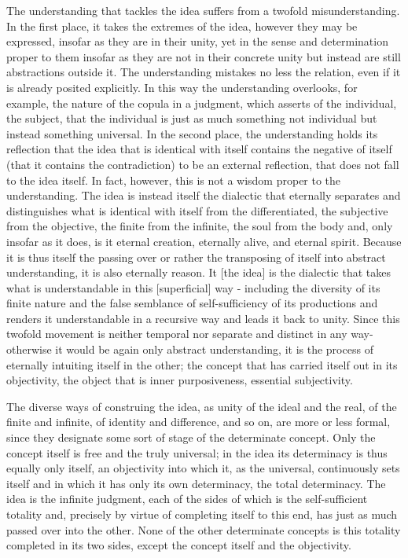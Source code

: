 The understanding that tackles the idea
suffers from a twofold misunderstanding.
In the first place, it takes the extremes of the idea,
however they may be expressed, insofar as they are in their unity,
yet in the sense and determination proper to them insofar as they are not
in their concrete unity but instead are still abstractions outside it.
The understanding mistakes no less the relation,
even if it is already posited explicitly.
In this way the understanding overlooks, for example,
the nature of the copula in a judgment,
which asserts of the individual, the subject,
that the individual is just as much something
not individual but instead something universal.
In the second place, the understanding holds its reflection that
the idea that is identical with itself contains the negative of itself
(that it contains the contradiction) to be an external reflection,
that does not fall to the idea itself.
In fact, however, this is not a wisdom proper to the understanding.
The idea is instead itself the dialectic that
eternally separates and distinguishes what is
identical with itself from the differentiated,
the subjective from the objective,
the finite from the infinite,
the soul from the body and,
only insofar as it does,
is it eternal creation,
eternally alive,
and eternal spirit.
Because it is thus itself the passing over or rather
the transposing of itself into abstract understanding,
it is also eternally reason.
It [the idea] is the dialectic that takes what is understandable
in this [superficial] way - including the diversity of its finite nature
and the false semblance of self-sufficiency of its productions
and renders it understandable in a recursive way
and leads it back to unity.
Since this twofold movement is neither temporal nor separate and distinct in any way-
otherwise it would be again only abstract understanding,
it is the process of eternally intuiting itself in the other;
the concept that has carried itself out in its objectivity,
the object that is inner purposiveness, essential subjectivity.

The diverse ways of construing the idea,
as unity of the ideal and the real,
of the finite and infinite,
of identity and difference,
and so on, are more or less formal,
since they designate some sort of
stage of the determinate concept.
Only the concept itself is free and the truly universal;
in the idea its determinacy is thus equally only itself,
an objectivity into which it, as the universal,
continuously sets itself and in which it has only
its own determinacy, the total determinacy.
The idea is the infinite judgment,
each of the sides of which is
the self-sufficient totality and,
precisely by virtue of completing itself to this end,
has just as much passed over into the other.
None of the other determinate concepts is
this totality completed in its two sides,
except the concept itself and the objectivity.


